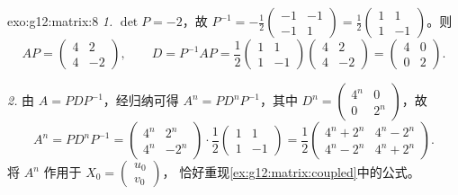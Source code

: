 \begin{solution}{exo:g12:matrix:8}
\emph{1.} $\det P = -2$，故
$P^{-1} = -\frac12\begin{pmatrix} -1 & -1\\ -1 & 1\end{pmatrix}
= \frac12\begin{pmatrix} 1 & 1\\ 1 & -1\end{pmatrix}$。则
\[
AP = \begin{pmatrix} 4 & 2\\ 4 & -2 \end{pmatrix}, \qquad
D = P^{-1}AP = \frac12\begin{pmatrix} 1&1\\1&-1\end{pmatrix}
\begin{pmatrix} 4&2\\4&-2\end{pmatrix}
= \begin{pmatrix} 4 & 0\\ 0 & 2\end{pmatrix}.
\]

\emph{2.} 由 $A = PDP^{-1}$，经归纳可得
$A^n = PD^nP^{-1}$，其中
$D^n = \begin{pmatrix} 4^n & 0\\ 0 & 2^n\end{pmatrix}$，故
\[
A^n = P D^n P^{-1}
= \begin{pmatrix} 4^n & 2^n\\ 4^n & -2^n\end{pmatrix}\cdot
\frac12\begin{pmatrix} 1&1\\1&-1\end{pmatrix}
= \frac12\begin{pmatrix} 4^n + 2^n & 4^n - 2^n\\
4^n - 2^n & 4^n + 2^n\end{pmatrix}.
\]
将 $A^n$ 作用于 $X_0 = \begin{pmatrix} u_0\\v_0\end{pmatrix}$，
恰好重现\cref{ex:g12:matrix:coupled}中的公式。
\end{solution}

